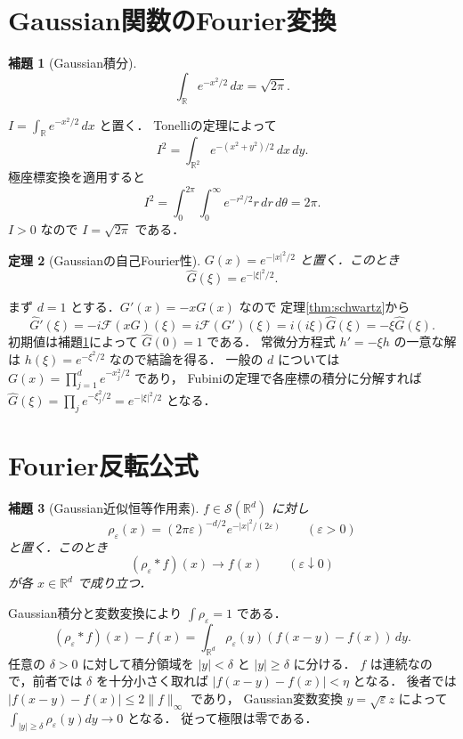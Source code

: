 \documentclass[a5paper,10pt,onecolumn]{jsarticle}
\makeatletter
\theoremstyle{mathnotetheorem}
\newtheorem{theorem}{定理}[section]
\newtheorem{lemma}[theorem]{補題}
\renewcommand{\proofname}{証明}
\renewenvironment{proof}[1][\proofname]{%
  \par\pushQED{\qed}\normalfont\topsep4\p@\@plus2\p@\relax
  \trivlist\item[\hskip\labelsep\bfseries #1]\ignorespaces
}{\popQED\endtrivlist\@endpefalse}
\newcommand{\norm}[1]{\lVert #1\rVert}
\makeatother
\begin{document}
\section{Gaussian関数のFourier変換}

\begin{lemma}[Gaussian積分]\label{lem:gaussian-integral}
\[
 \int_{\mathbb R}e^{-x^2/2}\,dx=\sqrt{2\pi}.
\]
\end{lemma}
\begin{proof}
$I=\int_{\mathbb R}e^{-x^2/2}\,dx$ と置く．
Tonelliの定理によって
\[
 I^2=\int_{\mathbb R^2}e^{-(x^2+y^2)/2}\,dx\,dy.
\]
極座標変換を適用すると
\[
 I^2=\int_0^{2\pi}\int_0^\infty
 e^{-r^2/2}r\,dr\,d\theta
 =2\pi.
\]
$I>0$ なので $I=\sqrt{2\pi}$ である．
\end{proof}

\begin{theorem}[Gaussianの自己Fourier性]\label{thm:gaussian}
$G(x)=e^{-|x|^2/2}$ と置く．このとき
\[
 \widehat G(\xi)=e^{-|\xi|^2/2}.
\]
\end{theorem}
\begin{proof}
まず $d=1$ とする．$G'(x)=-xG(x)$ なので
定理\ref{thm:schwartz}から
\[
 \widehat G'(\xi)
 =-i\mathcal F(xG)(\xi)
 =i\mathcal F(G')(\xi)
 =i(i\xi)\widehat G(\xi)
 =-\xi\widehat G(\xi).
\]
初期値は補題\ref{lem:gaussian-integral}によって
$\widehat G(0)=1$ である．
常微分方程式 $h'=-\xi h$ の一意な解は
$h(\xi)=e^{-\xi^2/2}$ なので結論を得る．
一般の $d$ については
$G(x)=\prod_{j=1}^de^{-x_j^2/2}$ であり，
Fubiniの定理で各座標の積分に分解すれば
$\widehat G(\xi)=\prod_j e^{-\xi_j^2/2}
=e^{-|\xi|^2/2}$ となる．
\end{proof}

\section{Fourier反転公式}

\begin{lemma}[Gaussian近似恒等作用素]\label{lem:gaussian-approx}
$f\in\mathcal S(\mathbb R^d)$ に対し
\[
 \rho_\varepsilon(x)
 =(2\pi\varepsilon)^{-d/2}e^{-|x|^2/(2\varepsilon)}
 \qquad(\varepsilon>0)
\]
と置く．このとき
\[
 (\rho_\varepsilon*f)(x)\to f(x)
 \qquad(\varepsilon\downarrow0)
\]
が各 $x\in\mathbb R^d$ で成り立つ．
\end{lemma}
\begin{proof}
Gaussian積分と変数変換により
$\int\rho_\varepsilon=1$ である．
\[
 (\rho_\varepsilon*f)(x)-f(x)
 =\int_{\mathbb R^d}
 \rho_\varepsilon(y)(f(x-y)-f(x))\,dy.
\]
任意の $\delta>0$ に対して積分領域を
$|y|<\delta$ と $|y|\ge\delta$ に分ける．
$f$ は連続なので，前者では $\delta$ を十分小さく取れば
$|f(x-y)-f(x)|<\eta$ となる．
後者では
$|f(x-y)-f(x)|\le2\norm f_\infty$ であり，
Gaussian変数変換 $y=\sqrt\varepsilon z$ によって
$\int_{|y|\ge\delta}\rho_\varepsilon(y)dy
 \to0$ となる．
従って極限は零である．
\end{proof}
\end{document}
